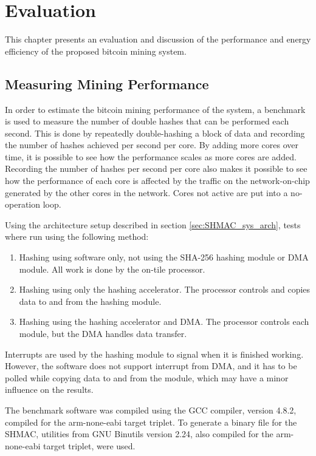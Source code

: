 \chapter{Evaluation}

This chapter presents an evaluation and discussion of the performance and energy efficiency
of the proposed bitcoin mining system.

\section{Measuring Mining Performance}

In order to estimate the bitcoin mining performance of the system, a benchmark is used to
measure the number of double hashes that can be performed each second.
This is done by repeatedly double-hashing a block of data and recording the
number of hashes achieved per second per core. By adding more cores over time, it
is possible to see how the performance scales as more cores are added. Recording
the number of hashes per second per core also makes it possible to see how the performance
of each core is affected by the traffic on the network-on-chip generated by the other
cores in the network. Cores not active are put into a no-operation loop.

Using the architecture setup described in section \ref{sec:SHMAC_sys_arch}, tests where run using the
following method:

\begin{enumerate}
    \item Hashing using software only, not using the SHA-256 hashing module or DMA module.
    All work is done by the on-tile processor.
    \item Hashing using only the hashing accelerator.
    The processor controls and copies data to and from the hashing module.
    \item Hashing using the hashing accelerator and DMA.
    The processor controls each module, but the DMA handles data transfer.
\end{enumerate}

Interrupts are used by the hashing module to signal when it is finished working. However,
the software does not support interrupt from DMA, and it has to be polled while copying data to and from
the module, which may have a minor influence on the results.

The benchmark software was compiled using the GCC compiler, version 4.8.2, compiled for
the arm-none-eabi target triplet. To generate a binary file for the SHMAC, utilities
from GNU Binutils version 2.24, also compiled for the arm-none-eabi target triplet,
were used.

